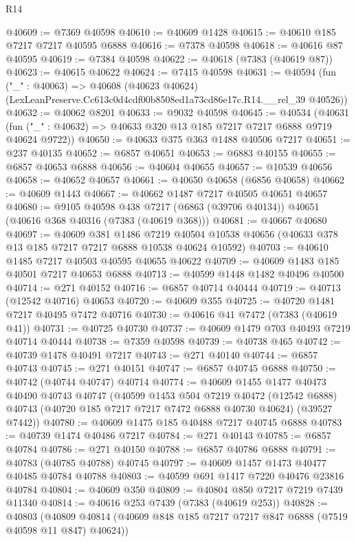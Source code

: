 \begin{lexlean}{R14}
\begin{coremodule}
@40609 := @7369 @40598
@40610 := @40609 @1428
@40615 := @40610 @185 @7217 @7217 @40595 @6888
@40616 := @7378 @40598
@40618 := @40616 @87 @40595
@40619 := @7384 @40598
@40622 := @40618 (@7383 (@40619 @87))
@40623 := @40615 @40622
@40624 := @7415 @40598
@40631 := @40594
    (fun ("_" : @40063) =>
    @40608 (@40623 @40624) (LexLeanPreserve.Cc613c0d4cdf00b8508ed1a73cd86e17c.R14.__rel_39 @40526))
@40632 := @40062 @8201
@40633 := @9032 @40598
@40645 := @40534
    (@40631 (fun ("_" : @40632) => @40633 @320 @13 @185 @7217 @7217 @6888 @9719 @40624 @9722))
@40650 := @40633 @375 @363 @1488 @40506 @7217
@40651 := @237 @40135
@40652 := @6857 @40651
@40653 := @6883 @40155
@40655 := @6857 @40653 @6888
@40656 := @40604 @40655
@40657 := @10539 @40656
@40658 := @40652 @40657
@40661 := @40650 @40658 (@6856 @40658)
@40662 := @40609 @1443
@40667 := @40662 @1487 @7217 @40505 @40651 @40657
@40680 := @9105
    @40598
    @438
    @7217
    (@6863 (@39706 @40134))
    @40651
    (@40616 @368 @40316 (@7383 (@40619 @368)))
@40681 := @40667 @40680
@40697 := @40609
    @381
    @1486
    @7219
    @40504
    @10538
    @40656
    (@40633 @378 @13 @185 @7217 @7217 @6888 @10538 @40624 @10592)
@40703 := @40610 @1485 @7217 @40503 @40595 @40655 @40622
@40709 := @40609 @1483 @185 @40501 @7217 @40653 @6888
@40713 := @40599 @1448 @1482 @40496 @40500
@40714 := @271 @40152
@40716 := @6857 @40714 @40444
@40719 := @40713 (@12542 @40716) @40653
@40720 := @40609 @355
@40725 := @40720 @1481 @7217 @40495 @7472 @40716
@40730 := @40616 @41 @7472 (@7383 (@40619 @41))
@40731 := @40725 @40730
@40737 := @40609 @1479 @703 @40493 @7219 @40714 @40444
@40738 := @7359 @40598
@40739 := @40738 @465
@40742 := @40739 @1478 @40491 @7217
@40743 := @271 @40140
@40744 := @6857 @40743
@40745 := @271 @40151
@40747 := @6857 @40745 @6888
@40750 := @40742 (@40744 @40747) @40714
@40774 := @40609
    @1455
    @1477
    @40473
    @40490
    @40743
    @40747
    (@40599
      @1453
      @504
      @7219
      @40472
      (@12542 @6888)
      @40743
      (@40720 @185 @7217 @7217 @7472 @6888 @40730 @40624)
      (@39527 @7442))
@40780 := @40609 @1475 @185 @40488 @7217 @40745 @6888
@40783 := @40739 @1474 @40486 @7217
@40784 := @271 @40143
@40785 := @6857 @40784
@40786 := @271 @40150
@40788 := @6857 @40786 @6888
@40791 := @40783 (@40785 @40788) @40745
@40797 := @40609 @1457 @1473 @40477 @40485 @40784 @40788
@40803 := @40599 @691 @1417 @7220 @40476 @23816 @40784
@40804 := @40609 @350
@40809 := @40804 @850 @7217 @7219 @7439 @11340
@40814 := @40616 @253 @7439 (@7383 (@40619 @253))
@40828 := @40803
    (@40809 @40814 (@40609 @848 @185 @7217 @7217 @847 @6888 (@7519 @40598 @11 @847) @40624))

\end{coremodule}
\end{lexlean}
